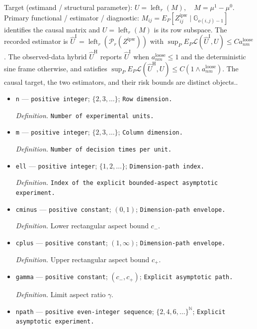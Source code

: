 \documentclass{article}
\begin{document}
Target (estimand / structural parameter): \(U=\operatorname{left}_r(M),\quad M=\mu^1-\mu^0\).
Primary functional / estimator / diagnostic: \(M_{ij}=E_P[Z^{\mathrm{ipw}}_{ij}\mid\mathbb G_{o(i,j)-1}]\) identifies the causal matrix and \(U=\operatorname{left}_r(M)\) is its row subspace.  The recorded estimator is \(\widehat U^{\mathrm I}=\operatorname{left}_r(\mathcal P_r(Z^{\mathrm{ipw}}))\) with \(\sup_P E_P\mathcal L(\widehat U^{\mathrm I},U)\le C a^{\mathrm{loose}}_{nm}\).  The observed-data hybrid \(\widehat U^{\mathrm H}\) reports \(\widehat U^{\mathrm I}\) when \(a^{\mathrm{loose}}_{nm}\le1\) and the deterministic sine frame otherwise, and satisfies \(\sup_P E_P\mathcal L(\widehat U^{\mathrm H},U)\le C(1\wedge a^{\mathrm{loose}}_{nm})\).  The causal target, the two estimators, and their risk bounds are distinct objects..
\begin{itemize}
  \item \texttt{n} --- \texttt{positive integer}; \(\{2,3,\ldots\}\); \texttt{Row dimension.}
  \par\smallskip\noindent\emph{Definition.} \texttt{Number of experimental units.}
  \item \texttt{m} --- \texttt{positive integer}; \(\{2,3,\ldots\}\); \texttt{Column dimension.}
  \par\smallskip\noindent\emph{Definition.} \texttt{Number of decision times per unit.}
  \item \texttt{ell} --- \texttt{positive integer}; \(\{1,2,\ldots\}\); \texttt{Dimension-\allowbreak{}path index.}
  \par\smallskip\noindent\emph{Definition.} \texttt{Index of the explicit bounded-\allowbreak{}aspect asymptotic experiment.}
  \item \texttt{cminus} --- \texttt{positive constant}; \((0,1)\); \texttt{Dimension-\allowbreak{}path envelope.}
  \par\smallskip\noindent\emph{Definition.} Lower rectangular aspect bound \(c_-\).
  \item \texttt{cplus} --- \texttt{positive constant}; \((1,\infty)\); \texttt{Dimension-\allowbreak{}path envelope.}
  \par\smallskip\noindent\emph{Definition.} Upper rectangular aspect bound \(c_+\).
  \item \texttt{gamma} --- \texttt{positive constant}; \((c_-,c_+)\); \texttt{Explicit asymptotic path.}
  \par\smallskip\noindent\emph{Definition.} Limit aspect ratio \(\gamma\).
  \item \texttt{npath} --- \texttt{positive even-\allowbreak{}integer sequence}; \(\{2,4,6,\ldots\}^{\mathbb N}\); \texttt{Explicit asymptotic experiment.}

\end{itemize}
\end{document}
